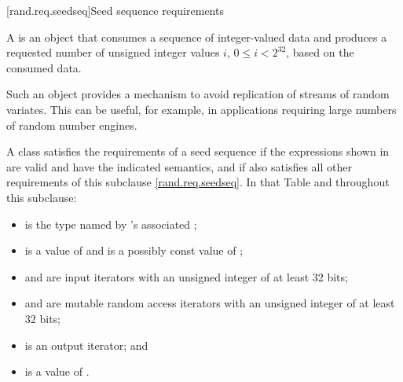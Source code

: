 
[rand.req.seedseq]{Seed sequence requirements}%
%

\pnum
 A 
 is an object
 that consumes a sequence
 of integer-valued data
 and produces a requested number
 of unsigned integer values $i$, $0 \le i < 2^{32}$,
 based on the consumed data.
\begin{note}
 Such an object provides a mechanism
 to avoid replication of streams of random variates.
 This can be useful, for example, in applications
 requiring large numbers of random number engines.
\end{note}

\pnum
A class 
satisfies the requirements
of a seed sequence
if the expressions shown
in 
are valid and have the indicated semantics,
and if  also satisfies all other requirements
of this subclause \ref{rand.req.seedseq}.
In that Table and throughout this subclause:
\begin{itemize}
  \item
     is the type named by
    's associated ;
  \item
     is a value of 
    and
     is a possibly const value of ;
  \item
     and  are input iterators
    with an unsigned integer  of at least 32 bits;
  \item
     and  are mutable random access iterators
    with an unsigned integer  of at least 32 bits;
  \item
     is an output iterator;
  and
  \item
     is a value of .
\end{itemize}


